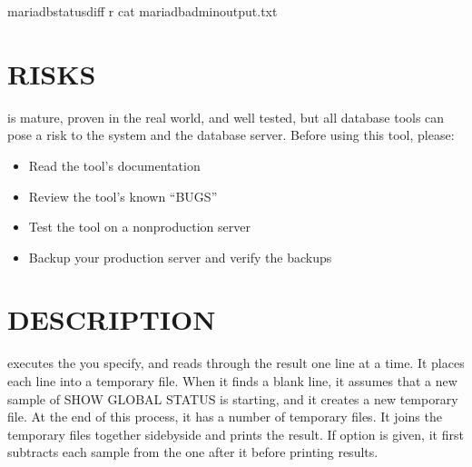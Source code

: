 \documentclass[letterpaper,10pt,english]{sphinxmanual}
\begin{document}
\begin{sphinxVerbatim}[commandchars=\\\{\}]
mariadb\PYGZhy{}status\PYGZhy{}diff \PYGZhy{}r \PYGZhy{}\PYGZhy{} cat mariadb\PYGZhy{}admin\PYGZhy{}output.txt
\end{sphinxVerbatim}


\section{RISKS}
\label{\detokenize{mariadb-status-diff:risks}}
\sphinxAtStartPar
{} is mature, proven in the real world, and well tested,
but all database tools can pose a risk to the system and the database
server.  Before using this tool, please:
\begin{itemize}
\item {} 
\sphinxAtStartPar
Read the tool’s documentation

\item {} 
\sphinxAtStartPar
Review the tool’s known “BUGS”

\item {} 
\sphinxAtStartPar
Test the tool on a non\sphinxhyphen{}production server

\item {} 
\sphinxAtStartPar
Backup your production server and verify the backups

\end{itemize}


\section{DESCRIPTION}
\label{\detokenize{mariadb-status-diff:description}}
\sphinxAtStartPar
{} executes the  you specify, and reads through the result one
line at a time.  It places each line into a temporary file.  When it finds a
blank line, it assumes that a new sample of SHOW GLOBAL STATUS is starting,
and it creates a new temporary file.  At the end of this process, it has a
number of temporary files.  It joins the temporary files together side\sphinxhyphen{}by\sphinxhyphen{}side
and prints the result.  If {\hyperref[\detokenize{mariadb-status-diff:cmdoption-mariadb-status-diff-relative}]{}} option is given, it first subtracts
each sample from the one after it before printing results.
\end{document}
